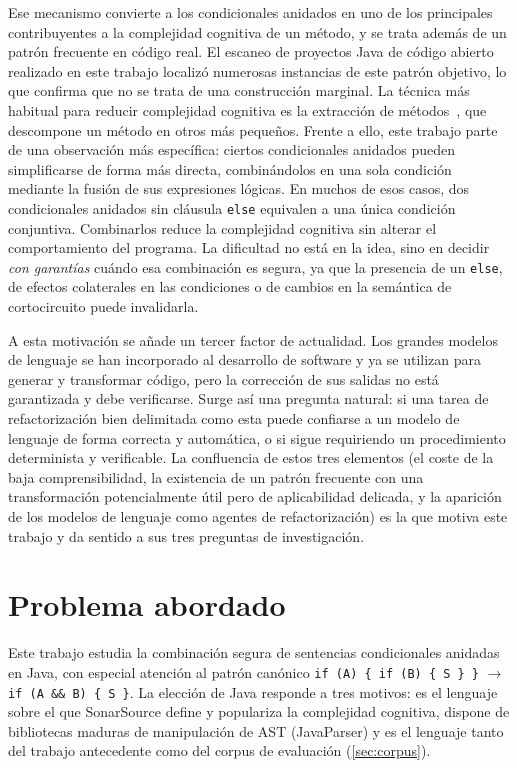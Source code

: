 Ese mecanismo convierte a los condicionales anidados en uno de los principales
contribuyentes a la complejidad cognitiva de un método, y se trata además de
un patrón frecuente en código real. El escaneo de proyectos Java de código
abierto realizado en este trabajo localizó numerosas instancias de este patrón
objetivo, lo que confirma que no se trata de una construcción marginal. La
técnica más habitual para reducir complejidad cognitiva es la extracción de
métodos~\cite{10.1109/ACCESS.2022.3144743}, que descompone un método en otros
más pequeños. Frente a ello, este trabajo parte de una observación más
específica: ciertos condicionales anidados pueden simplificarse de forma más
directa, combinándolos en una sola condición mediante la fusión de sus
expresiones lógicas. En muchos de esos casos, dos condicionales anidados sin
cláusula \lstinline|else| equivalen a una única condición conjuntiva.
Combinarlos reduce la complejidad cognitiva sin alterar el comportamiento del
programa. La dificultad no está en la idea, sino en decidir \emph{con
garantías} cuándo esa combinación es segura, ya que la presencia de un
\lstinline|else|, de efectos colaterales en las condiciones o de cambios en
la semántica de cortocircuito puede invalidarla.

A esta motivación se añade un tercer factor de actualidad. Los grandes
modelos de lenguaje se han incorporado al desarrollo de software y ya se
utilizan para generar y transformar código, pero la corrección de sus salidas
no está garantizada y debe verificarse. Surge así una pregunta natural: si
una tarea de refactorización bien delimitada como esta puede confiarse a un
modelo de lenguaje de forma correcta y automática, o si sigue requiriendo un
procedimiento determinista y verificable. La confluencia de estos tres
elementos (el coste de la baja comprensibilidad, la existencia de un patrón
frecuente con una transformación potencialmente útil pero de aplicabilidad
delicada, y la aparición de los modelos de lenguaje como agentes de
refactorización) es la que motiva este trabajo y da sentido a sus tres
preguntas de investigación.

\section{Problema abordado}
\label{sec:problema-intro}

Este trabajo estudia la combinación segura de sentencias condicionales
anidadas en Java, con especial atención al patrón canónico
\lstinline|if (A) { if (B) { S } }| $\rightarrow$ \lstinline|if (A && B) { S }|.
La elección de Java responde a tres motivos: es el lenguaje sobre el que
SonarSource define y populariza la complejidad cognitiva, dispone de
bibliotecas maduras de manipulación de AST (JavaParser) y es el lenguaje tanto
del trabajo antecedente como del corpus de evaluación (\autoref{sec:corpus}).


